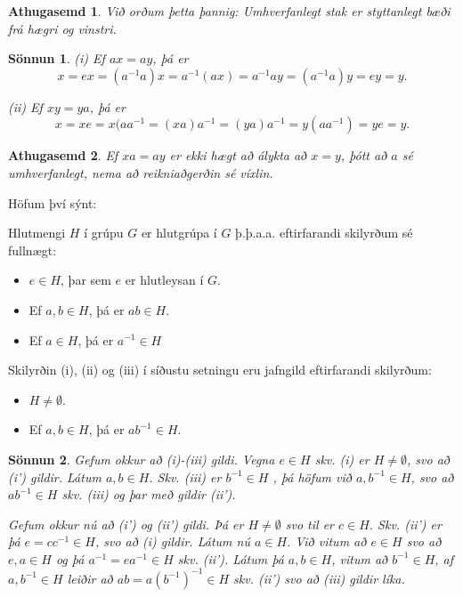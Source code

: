 \documentclass[a4paper,icelandic,11pt]{book}
\theoremstyle{plain}
\newtheorem*{ath}{Athugasemd}
\newtheorem*{sonnun}{Sönnun}
\begin{document}
\begin{ath}
  Við orðum þetta þannig: Umhverfanlegt stak er styttanlegt bæði frá hægri og vinstri.
\end{ath}
\begin{sonnun}
 (i) Ef $ax = ay$, þá er
 \[ x = ex = (a^{-1}a) x = a^{-1}(ax) = a^{-1}ay = (a^{-1}a)y = ey = y. \]

 (ii) Ef $xy = ya$, þá er
 \[ x = xe = x(aa^{-1} = (xa)a^{-1} = (ya)a^{-1} = y(aa^{-1}) = ye = y. \]
\end{sonnun}
\begin{ath}
  Ef $xa = ay$ er ekki hægt að álykta að $x = y$, þótt að $a$ sé
  umhverfanlegt, \emph{nema} að reikniaðgerðin sé víxlin.
\end{ath}
Höfum því sýnt:
\begin{setn}
  Hlutmengi $H$ í grúpu $G$ er hlutgrúpa í $G$ þ.þ.a.a. eftirfarandi skilyrðum
  sé fullnægt:
  \begin{itemize}
    \item [(i)] $e\in H$, þar sem $e$ er hlutleysan í $G$.
    \item [(ii)] Ef $a,b \in H$, þá er $ab\in H$.
    \item [(iii)] Ef $a\in H$, þá er $a^{-1}\in H$
  \end{itemize}
\end{setn}
\begin{setn}
  Skilyrðin (i), (ii) og (iii) í síðustu setningu eru jafngild eftirfarandi
  skilyrðum:
  \begin{itemize}
    \item [(i')] $H\neq \emptyset$.
    \item [(ii')] Ef $a,b\in H$, þá er $ab^{-1} \in H$.
  \end{itemize}
\end{setn}
\begin{sonnun}
  Gefum okkur að (i)-(iii) gildi. Vegna $e\in H$ skv. (i) er $H\neq
  \emptyset$, svo að (i') gildir. Látum $a,b\in H$. Skv. (iii) er $b^{-1}\in
  H$ , þá höfum við $a,b^{-1}\in H$, svo að $ab^{-1}\in H$ skv. (iii) og þar
  með gildir (ii').

  Gefum okkur nú að (i') og (ii') gildi. Þá er $H\neq \emptyset$ svo til er
  $c\in H$. Skv. (ii') er þá $e = cc^{-1}\in H$, svo að (i) gildir. Látum nú
  $a\in H$. Við vitum að $e\in H$ svo að $e,a\in H$ og þá $a^{-1} = ea^{-1}
  \in H$ skv. (ii'). Látum þá $a,b\in H$, vitum að $b^{-1}\in H$, af
  $a,b^{-1}\in H$ leiðir að $ab = a(b^{-1})^{-1} \in H$ skv. (ii') svo að
  (iii) gildir líka.
\end{sonnun}
\end{document}

